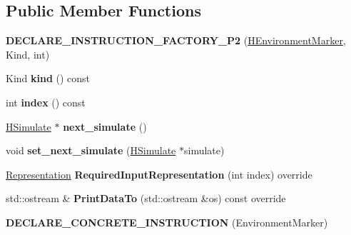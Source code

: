 \subsection*{Public Member Functions}
\begin{DoxyCompactItemize}
\item 
{\bfseries D\+E\+C\+L\+A\+R\+E\+\_\+\+I\+N\+S\+T\+R\+U\+C\+T\+I\+O\+N\+\_\+\+F\+A\+C\+T\+O\+R\+Y\+\_\+\+P2} (\hyperlink{classv8_1_1internal_1_1_h_environment_marker}{H\+Environment\+Marker}, Kind, int)\hypertarget{classv8_1_1internal_1_1_h_environment_marker_a98f26f089c3fffd8918b48ee58c6fb12}{}\label{classv8_1_1internal_1_1_h_environment_marker_a98f26f089c3fffd8918b48ee58c6fb12}

\item 
Kind {\bfseries kind} () const \hypertarget{classv8_1_1internal_1_1_h_environment_marker_a1b82c785aa8c58b91a48b05e8035d13d}{}\label{classv8_1_1internal_1_1_h_environment_marker_a1b82c785aa8c58b91a48b05e8035d13d}

\item 
int {\bfseries index} () const \hypertarget{classv8_1_1internal_1_1_h_environment_marker_a1a1745e761885b84b8eaf8a547121929}{}\label{classv8_1_1internal_1_1_h_environment_marker_a1a1745e761885b84b8eaf8a547121929}

\item 
\hyperlink{classv8_1_1internal_1_1_h_simulate}{H\+Simulate} $\ast$ {\bfseries next\+\_\+simulate} ()\hypertarget{classv8_1_1internal_1_1_h_environment_marker_a1059566e84609b1f502d6b0db167e3c6}{}\label{classv8_1_1internal_1_1_h_environment_marker_a1059566e84609b1f502d6b0db167e3c6}

\item 
void {\bfseries set\+\_\+next\+\_\+simulate} (\hyperlink{classv8_1_1internal_1_1_h_simulate}{H\+Simulate} $\ast$simulate)\hypertarget{classv8_1_1internal_1_1_h_environment_marker_a65b5a7f6d61cc7d9a76fe72d7a5758da}{}\label{classv8_1_1internal_1_1_h_environment_marker_a65b5a7f6d61cc7d9a76fe72d7a5758da}

\item 
\hyperlink{classv8_1_1internal_1_1_representation}{Representation} {\bfseries Required\+Input\+Representation} (int index) override\hypertarget{classv8_1_1internal_1_1_h_environment_marker_a11fb4c0ffb17f5a4b5c9d0c51fa9576c}{}\label{classv8_1_1internal_1_1_h_environment_marker_a11fb4c0ffb17f5a4b5c9d0c51fa9576c}

\item 
std\+::ostream \& {\bfseries Print\+Data\+To} (std\+::ostream \&os) const  override\hypertarget{classv8_1_1internal_1_1_h_environment_marker_a42618b9b6ff0d3439f319257ae705f81}{}\label{classv8_1_1internal_1_1_h_environment_marker_a42618b9b6ff0d3439f319257ae705f81}

\item 
{\bfseries D\+E\+C\+L\+A\+R\+E\+\_\+\+C\+O\+N\+C\+R\+E\+T\+E\+\_\+\+I\+N\+S\+T\+R\+U\+C\+T\+I\+ON} (Environment\+Marker)\hypertarget{classv8_1_1internal_1_1_h_environment_marker_adc5ec0799eaf636e745bb292f89253bf}{}\label{classv8_1_1internal_1_1_h_environment_marker_adc5ec0799eaf636e745bb292f89253bf}

\end{DoxyCompactItemize}
